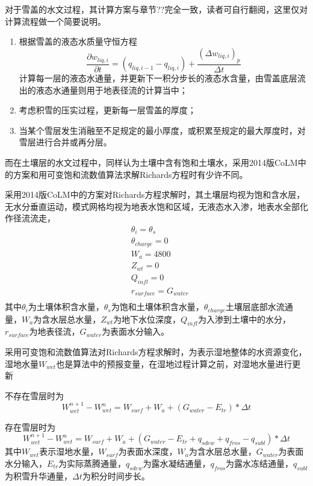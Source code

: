 对于雪盖的水文过程，其计算方案与章节??完全一致，读者可自行翻阅，这里仅对计算流程做一个简要说明。
\begin{enumerate}
    \item 根据雪盖的液态水质量守恒方程
    \begin{equation}
            \frac{\partial w_{liq,i}}{\partial t}=\left(q_{liq,i-1}-q_{liq,i}\right)+\frac{{\left(\Delta w_{liq,i}\right)}_p}{\Delta t}
    \end{equation}
    计算每一层的液态水通量，并更新下一积分步长的液态水含量，由雪盖底层流出的液态水通量则用于地表径流的计算当中；
    \item 考虑积雪的压实过程，更新每一层雪盖的厚度；
    \item 当某个雪层发生消融至不足规定的最小厚度，或积累至规定的最大厚度时，对雪层进行合并或再分层。
\end{enumerate}

而在土壤层的水文过程中，同样认为土壤中含有饱和土壤水，采用2014版CoLM中的方案和用可变饱和流数值算法求解Richards方程时有少许不同。

采用2014版CoLM中的方案对Richards方程求解时，其土壤层均视为饱和含水层，无水分垂直运动，模式网格均视为地表水饱和区域，无液态水入渗，地表水全部化作径流流走，
\begin{equation}
\begin{aligned}
    &\theta_{i} =\theta_{s} \\
    &\theta_{charge} =0 \\
    &W_{a} =4800 \\
    &Z_{wt} =0 \\
    &Q_{infl} =0 \\
    &r_{surface} =G_{water} \\
\end{aligned}
\end{equation}
其中$\theta_{i}$为土壤体积含水量，$\theta_{s}$为饱和土壤体积含水量，$\theta_{charge}$土壤层底部水流通量，$W_{a}$为含水层总水量，$Z_{wt}$为地下水位深度，$Q_{infl}$为入渗到土壤中的水分，$r_{surface}$为地表径流，$G_{water}$为表面水分输入。

采用可变饱和流数值算法对Richards方程求解时，为表示湿地整体的水资源变化，湿地水量$W_{wet}$也是算法中的预报变量，在湿地过程计算之前，对湿地水量进行更新

不存在雪层时为
\begin{equation}
W_{wet}^{n+1}-W_{wet}^{n}=W_{surf}+W_{a}+\left(G_{water}-E_{tr}\right)*{\Delta t}
\end{equation}

存在雪层时为
\begin{equation}
W_{wet}^{n+1}-W_{wet}^{n}=W_{surf}+W_{a}+\left(G_{water}-E_{tr}+q_{sdew}+q_{fros}-q_{subl}\right)*{\Delta t}
\end{equation}
其中$W_{wet}$表示湿地水量，$W_{surf}$为表面水深度，$W_{a}$为含水层总水量，$G_{water}$为表面水分输入，$E_{tr}$为实际蒸腾通量，$q_{sdew}$为露水凝结通量，$q_{fros}$为露水冻结通量，$q_{subl}$为积雪升华通量，${\Delta t}$为积分时间步长。

